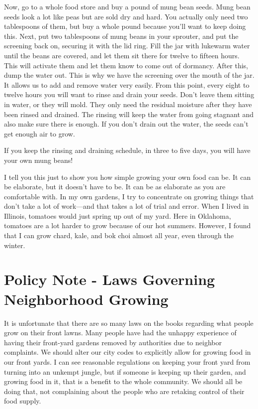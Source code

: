 Now, go to a whole food store and buy a pound of mung bean seeds. Mung
bean seeds look a lot like peas but are sold dry and hard. You actually
only need two tablespoons of them, but buy a whole pound because you’ll
want to keep doing this. Next, put two tablespoons of mung beans in
your sprouter, and put the screening back on, securing it with the lid
ring. Fill the jar with lukewarm water until the beans are covered, and
let them sit there for twelve to fifteen hours. This will activate them
and let them know to come out of dormancy. After this, dump the water
out. This is why we have the screening over the mouth of the jar.  It
allows us to add and remove water very easily. From this point, every
eight to twelve hours you will want to rinse and drain your seeds.
Don’t leave them sitting in water, or they will mold. They only need
the residual moisture after they have been rinsed and drained. The
rinsing will keep the water from going stagnant and also make sure
there is enough. If you don’t drain out the water, the seeds can’t get
enough air to grow. 

If you keep the rinsing and draining schedule, in three to five days,
you will have your own mung beans!

I tell you this just to show you how simple growing your own food can
be. It can be elaborate, but it doesn’t have to be. It can be as
elaborate as you are comfortable with. In my own gardens, I try to
concentrate on growing things that don’t take a lot of work—and that
takes a lot of trial and error. When I lived in Illinois, tomatoes
would just spring up out of my yard. Here in Oklahoma, tomatoes are a
lot harder to grow because of our hot summers. However, I found that I
can grow chard, kale, and bok choi almost all year, even through the
winter.

\section{Policy Note - Laws Governing Neighborhood Growing}

It is unfortunate that there are so many laws on the books regarding
what people grow on their front lawns. Many people have had the unhappy
experience of having their front-yard gardens removed by authorities
due to neighbor complaints. We should alter our city codes to
explicitly allow for growing food in our front yards. I can see
reasonable regulations on keeping your front yard from turning into an
unkempt jungle, but if someone is keeping up their garden, and growing
food in it, that is a benefit to the whole community. We should all be
doing that, not complaining about the people who are retaking control
of their food supply.

